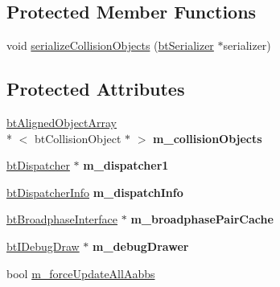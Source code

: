 \subsection*{Protected Member Functions}
\begin{DoxyCompactItemize}
\item 
void \hyperlink{classbt_collision_world_aeed5861d66035fa72f40e27b04bdc056}{serialize\+Collision\+Objects} (\hyperlink{classbt_serializer}{bt\+Serializer} $\ast$serializer)
\end{DoxyCompactItemize}
\subsection*{Protected Attributes}
\begin{DoxyCompactItemize}
\item 
\hypertarget{classbt_collision_world_a56afeead1af07bd88814d9161cb86890}{\hyperlink{classbt_aligned_object_array}{bt\+Aligned\+Object\+Array}\\*
$<$ bt\+Collision\+Object $\ast$ $>$ {\bfseries m\+\_\+collision\+Objects}}\label{classbt_collision_world_a56afeead1af07bd88814d9161cb86890}

\item 
\hypertarget{classbt_collision_world_aa6f6b4ae48398f89cda55492b7b55631}{\hyperlink{classbt_dispatcher}{bt\+Dispatcher} $\ast$ {\bfseries m\+\_\+dispatcher1}}\label{classbt_collision_world_aa6f6b4ae48398f89cda55492b7b55631}

\item 
\hypertarget{classbt_collision_world_a07f4c7b327bd773c557a4804bfec7445}{\hyperlink{structbt_dispatcher_info}{bt\+Dispatcher\+Info} {\bfseries m\+\_\+dispatch\+Info}}\label{classbt_collision_world_a07f4c7b327bd773c557a4804bfec7445}

\item 
\hypertarget{classbt_collision_world_a3f76ba02cdee172f17965e3414ac7a61}{\hyperlink{classbt_broadphase_interface}{bt\+Broadphase\+Interface} $\ast$ {\bfseries m\+\_\+broadphase\+Pair\+Cache}}\label{classbt_collision_world_a3f76ba02cdee172f17965e3414ac7a61}

\item 
\hypertarget{classbt_collision_world_a9bba31b9a780935bba1141e467155941}{\hyperlink{classbt_i_debug_draw}{bt\+I\+Debug\+Draw} $\ast$ {\bfseries m\+\_\+debug\+Drawer}}\label{classbt_collision_world_a9bba31b9a780935bba1141e467155941}

\item 
bool \hyperlink{classbt_collision_world_a91b110fc2501b965cdcaa2a6e1d89999}{m\+\_\+force\+Update\+All\+Aabbs}
\end{DoxyCompactItemize}


